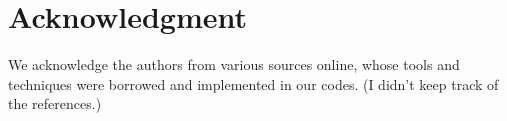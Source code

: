 \documentclass[12pt,letterpaper,final]{article}
\numberwithin{equation}{section}
\begin{document}
\section{Acknowledgment}

We acknowledge the authors from various sources online, whose tools and techniques were borrowed and implemented in our codes. (I didn't keep track of the references.)


%
%
%
%
%
%
%
\end{document}
